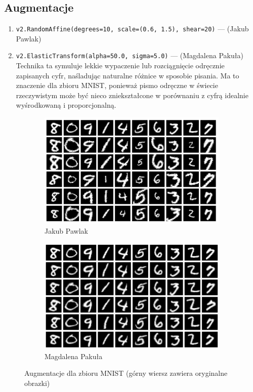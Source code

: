 \documentclass[10pt]{article}
\begin{document}
\subsection*{Augmentacje}
\begin{enumerate}
    \item \texttt{v2.RandomAffine(degrees=10, scale=(0.6, 1.5), shear=20)} --- (Jakub Pawlak)
    \item \texttt{v2.ElasticTransform(alpha=50.0, sigma=5.0)} --- (Magdalena Pakuła)  \\
          Technika ta symuluje lekkie wypaczenie lub rozciągnięcie odręcznie zapisanych cyfr, naśladując naturalne różnice w sposobie pisania.
          Ma to znaczenie dla zbioru MNIST, ponieważ pismo odręczne w świecie rzeczywistym może być nieco zniekształcone w porównaniu z cyfrą idealnie wyśrodkowaną i proporcjonalną.
\end{enumerate}

\begin{figure}[H]\centering
    \begin{subfigure}[t]{.45\textwidth}
        \centering
        \includegraphics[width=.7\linewidth]{img/kuba/mnist/augmentations.png}
        \caption{Jakub Pawlak}
    \end{subfigure}
    \begin{subfigure}[t]{.45\textwidth}
        \centering
        \includegraphics[width=0.7\linewidth]{img/magda/augmented_MNIST}
        \caption{Magdalena Pakuła}
    \end{subfigure}
    \caption{Augmentacje dla zbioru MNIST (górny wiersz zawiera oryginalne obrazki)}
\end{figure}
\end{document}
